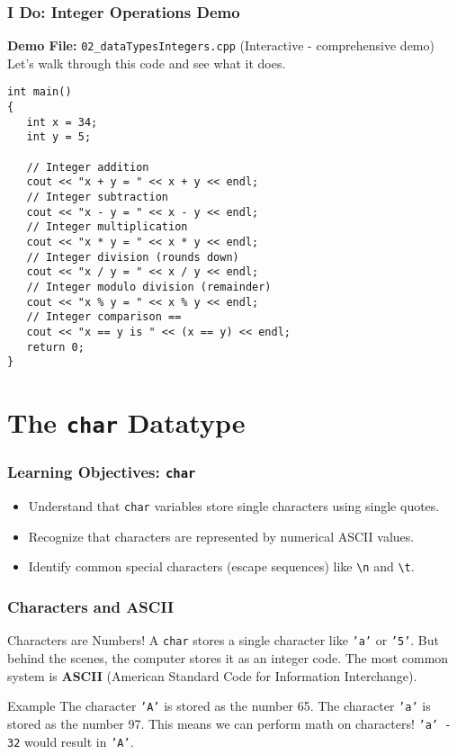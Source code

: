 \documentclass{beamer}
\begin{document}
\begin{frame}[fragile]
\frametitle{I Do: Integer Operations Demo}
\textbf{Demo File:} \texttt{02\_dataTypesIntegers.cpp} (Interactive - comprehensive demo)
\\Let's walk through this code and see what it does.\pause
\begin{verbatim}
int main()
{
   int x = 34;
   int y = 5;

   // Integer addition
   cout << "x + y = " << x + y << endl;
   // Integer subtraction
   cout << "x - y = " << x - y << endl;
   // Integer multiplication
   cout << "x * y = " << x * y << endl;
   // Integer division (rounds down)
   cout << "x / y = " << x / y << endl;
   // Integer modulo division (remainder)
   cout << "x % y = " << x % y << endl;
   // Integer comparison ==
   cout << "x == y is " << (x == y) << endl;
   return 0;
}
\end{verbatim}
\end{frame}


\section{The \texttt{char} Datatype}

\begin{frame}
\frametitle{Learning Objectives: \texttt{char}}
\begin{itemize}
    \item Understand that \texttt{char} variables store single characters using single quotes.\pause
    \item Recognize that characters are represented by numerical ASCII values.\pause
    \item Identify common special characters (escape sequences) like \texttt{\textbackslash n} and \texttt{\textbackslash t}.
\end{itemize}
\end{frame}

\begin{frame}
\frametitle{Characters and ASCII}
\begin{alertblock}{Characters are Numbers!}
A \texttt{char} stores a single character like \texttt{'a'} or \texttt{'5'}. But behind the scenes, the computer stores it as an integer code. The most common system is \textbf{ASCII} (American Standard Code for Information Interchange).
\end{alertblock}\pause
\begin{exampleblock}{Example}
The character \texttt{'A'} is stored as the number 65.
\newline
The character \texttt{'a'} is stored as the number 97.\pause
\newline
This means we can perform math on characters! \texttt{'a' - 32} would result in \texttt{'A'}.
\end{exampleblock}
\end{frame}
\end{document}

